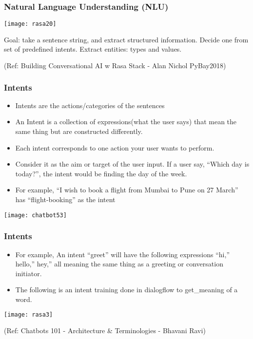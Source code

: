 \begin{frame}[fragile]\frametitle{Natural Language Understanding (NLU)}


\begin{center}
\texttt{[image: rasa20]}
\end{center}

Goal: take a sentence string, and extract structured information. Decide one from set of predefined intents. Extract entities: types and values.

{\tiny (Ref: Building Conversational AI w Rasa Stack - Alan Nichol  PyBay2018)}

\end{frame}

 \begin{frame}[fragile]\frametitle{Intents}
\begin{itemize}
\item Intents are the actions/categories of the sentences
\item An Intent is a collection of expressions(what the user says) that mean the same thing but are constructed differently. \item Each intent corresponds to one action your user wants to perform.
\item Consider it as the aim or target of the user input. If a user say, ``Which day is today?'', the intent would be finding the day of the week.
\item For example, ``I wish to book a flight from Mumbai to Pune on 27 March'' has ``flight-booking'' as the intent 
\end{itemize}

\begin{center}
\texttt{[image: chatbot53]}
\end{center}

\end{frame}


 \begin{frame}[fragile]\frametitle{Intents}
\begin{itemize}
\item For example, An intent ``greet'' will have the following expressions ``hi,'' hello,'' hey,'' all meaning the same thing as a greeting or conversation initiator.
\item The following is an intent training done in dialogflow to get\_meaning of a word.
\end{itemize}

\begin{center}
\texttt{[image: rasa3]}
\end{center}

{\tiny (Ref: Chatbots 101 - Architecture \& Terminologies -  Bhavani Ravi)}

\end{frame}


